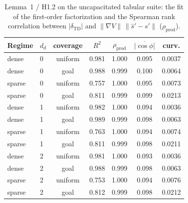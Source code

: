 \begin{table}[htbp]
\centering
\caption{Lemma~1 / H1.2 on the uncapacitated tabular suite: the fit of the first-order factorization and the Spearman rank correlation between $|\delta_{\text{TD}}|$ and $\|\nabla V\|\,\|\hat s'-s'\|$ ($\rho_{\text{prod}}$).}
\label{tab:h12}
\begin{tabular}{llccccc}
\toprule
Regime & $d_d$ & coverage & $R^2$ & $\rho_{\text{prod}}$ & $\overline{|\cos\phi|}$ & curv. \\
\midrule
dense & 0 & uniform & 0.981 & 1.000 & 0.095 & 0.0037 \\
dense & 0 & goal & 0.988 & 0.999 & 0.100 & 0.0064 \\
sparse & 0 & uniform & 0.757 & 1.000 & 0.095 & 0.0073 \\
sparse & 0 & goal & 0.811 & 0.999 & 0.099 & 0.0213 \\
dense & 1 & uniform & 0.982 & 1.000 & 0.094 & 0.0036 \\
dense & 1 & goal & 0.989 & 0.999 & 0.098 & 0.0063 \\
sparse & 1 & uniform & 0.763 & 1.000 & 0.094 & 0.0074 \\
sparse & 1 & goal & 0.811 & 0.999 & 0.098 & 0.0211 \\
dense & 2 & uniform & 0.981 & 1.000 & 0.093 & 0.0036 \\
dense & 2 & goal & 0.988 & 0.999 & 0.098 & 0.0063 \\
sparse & 2 & uniform & 0.753 & 1.000 & 0.094 & 0.0076 \\
sparse & 2 & goal & 0.812 & 0.999 & 0.098 & 0.0212 \\
\bottomrule
\end{tabular}
\end{table}
